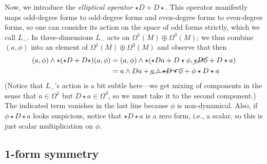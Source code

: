 \documentclass{report}
\begin{document}
Now, we introduce the \textit{elliptical operator} $ \star D + D\star $. This 
operator manifestly maps odd-degree forms to odd-degree forms and even-degree 
forms to even-degree forms, so one can consider its action on the space of 
odd forms strictly, which we call $ L_- $. In three-dimensions $ L_- $ acts 
on $ \Omega^1(M) \oplus \Omega^3 (M) $; we thus combine $ (a,\phi) $ into an 
element of $ \Omega^1(M) \oplus \Omega^3 (M) $ and observe that then 
\begin{align*}
	(a,\phi) \wedge \star (\star D + D \star) (a,\phi)
		&= (a,\phi) \wedge \star (\star D a + D\star \phi, \cancel{\star D \phi} + D\star a )\\
		&= a \wedge D a + \cancel{a \wedge \star D \star \phi} + \phi \star D\star a 
\end{align*}
(Notice that $ L_- $'s action is a bit subtle here---we get mixing of components 
in the sense that $ a \in \Omega^1 $ but $ D\star a \in \Omega^3 $, so we must 
take it to the second component.) The indicated term vanishes in the last 
line because $ \phi $ is non-dynamical. Also, if $ \phi\star D\star a $ looks 
suspicious, notice that $ \star D \star a $ is a zero form, i.e., a scalar, 
so this is just scalar multiplication on $ \phi $.


\subsection{1-form symmetry}
\end{document}
